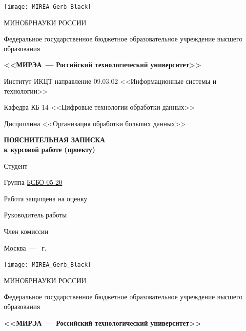 \begin{titlepage}
	\newpage
	\begin{center}
		\texttt{[image: MIREA\_Gerb\_Black]} \par
		МИНОБРНАУКИ РОССИИ \par 
		Федеральное государственное бюджетное образовательное учреждение высшего образования \par
		\textbf{<<МИРЭА~--- Российский технологический университет>>} \par
	\end{center}
	
	Институт ИКЦТ направление 09.03.02 <<Информационные системы и технологии>>
	
	Кафедра КБ-14 <<Цифровые технологии обработки данных>>
	
	Дисциплина <<Организация обработки больших данных>>
	
	\begin{center}
		\vspace*{1cm}
		{\fontsize{16pt}{16pt}\selectfont
			\textbf{ПОЯСНИТЕЛЬНАЯ ЗАПИСКА \\ к курсовой работе (проекту) }} \par
	\end{center}
	
	Студент \underline{\studentname} \par\vspace*{.3cm}
	Группа \underline{БСБО-05-20} \par\vspace*{.3cm}
	Работа защищена на оценку \underline{\hspace*{4cm}} \par\vspace*{.3cm}
	Руководитель работы	\underline{\hspace*{4cm}} \par\vspace*{.3cm}
	Член комиссии \underline{\hspace*{4cm}}
	\begin{center}
		\vfill Москва~--- \the\year{}~г.
	\end{center}
	
	\newpage
	\begin{center}
		\texttt{[image: MIREA\_Gerb\_Black]} \par
		МИНОБРНАУКИ РОССИИ \par 
		Федеральное государственное бюджетное образовательное учреждение высшего образования \par
		\textbf{<<МИРЭА~--- Российский технологический университет>>} \par
	\end{center}
	

\end{titlepage}
